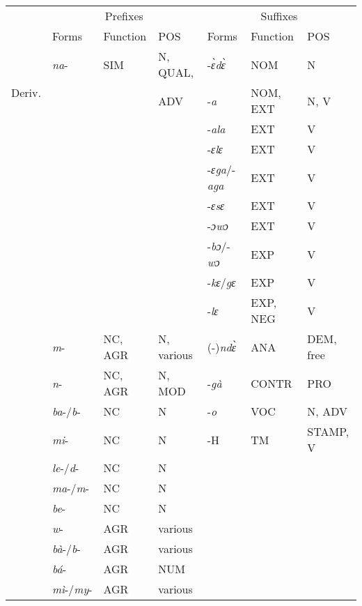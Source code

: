 \begin{table}[!h]
\centering
\small
\begin{tabular}{l|lll|lll}
 \midrule 
 					&   \multicolumn{3}{c|}{Prefixes} &  \multicolumn{3}{c}{Suffixes} \\
\cline{2-7}  
					& Forms & Function & POS         & Forms & Function & POS       \\ 
 \midrule
\multirow{3}{*}{Deriv.} & {\itshape na}- & SIM   	&  N, QUAL,	  &  -{\itshape ɛ̀dɛ̀} & NOM	   & N	\\
					& 		& 	&  ADV  		&  -{\itshape a} & NOM, EXT & N, V 	 \\
					& 		& 	& 			& -{\itshape ala} & EXT	& V 		\\
					& 		& 	& 			& -{\itshape ɛlɛ} & EXT	& V 		\\
					& 		& 	& 			& -{\itshape ɛga}/-{\itshape aga} & EXT & V \\
					& 		& 	& 			& -{\itshape ɛsɛ} & EXT	& V 		\\
					& 		& 	& 			& -{\itshape ɔwɔ} & EXT	& V 		\\
					& 		& 	& 			& -{\itshape bɔ}/-{\itshape wɔ} & EXP	& V 		\\
					& 		& 	& 			& -{\itshape kɛ}/{\itshape gɛ} & EXP	& V 		\\ 
\hdashline[0.6pt/4pt]
					& 		& 	& 			& -{\itshape lɛ} & EXP, NEG	& V 		\\
\hdashline[0.6pt/4pt]
\multirow{7}{*}{Infl.}          & {\itshape m}- & NC, AGR	& N, various 	&  (-){\itshape ndɛ̀} &  ANA	& DEM, free	\\
					& {\itshape n}- &  NC, AGR	& N, MOD 	&  -{\itshape gà} & CONTR	&  PRO 	\\
					& {\itshape ba}-/{\itshape b}- & NC & N 	        & -{\itshape o} &  VOC & 	N, ADV	\\
					& {\itshape mi}-		& NC & N 		&   -H & TM	&  STAMP, V 	\\
					& {\itshape le}-/{\itshape d}- & NC & N 	&  & 	&  \\
					& {\itshape ma}-/{\itshape m}-		& NC & N 		&  & 		&			\\
					& {\itshape be}-		& NC & N 			& &  		& 			\\ 
					& {\itshape w}-		& AGR & various	& &  		& 	 		\\ 
					& {\itshape bà}-/{\itshape b}-	& AGR & various 	& &  		& 	\\ 
					& {\itshape bá}-		& AGR & NUM 			& &  		& 			\\ 
					& {\itshape mì}-/{\itshape my}-		& AGR & various	& &  	&	\\ 

\end{tabular}
\end{table}
